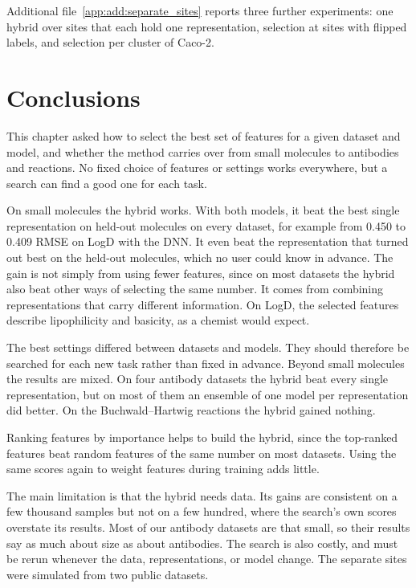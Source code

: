 Additional file~\ref{app:add:separate_sites} reports three further experiments: one hybrid over sites that each hold one representation, selection at sites with flipped labels, and selection per cluster of Caco-2.

\section{Conclusions}

This chapter asked how to select the best set of features for a given dataset and model, and whether the method carries over from small molecules to antibodies and reactions. No fixed choice of features or settings works everywhere, but a search can find a good one for each task.

On small molecules the hybrid works. With both models, it beat the best single representation on held-out molecules on every dataset, for example from 0.450 to 0.409 RMSE on LogD with the DNN. It even beat the representation that turned out best on the held-out molecules, which no user could know in advance. The gain is not simply from using fewer features, since on most datasets the hybrid also beat other ways of selecting the same number. It comes from combining representations that carry different information. On LogD, the selected features describe lipophilicity and basicity, as a chemist would expect.

The best settings differed between datasets and models. They should therefore be searched for each new task rather than fixed in advance. Beyond small molecules the results are mixed. On four antibody datasets the hybrid beat every single representation, but on most of them an ensemble of one model per representation did better. On the Buchwald--Hartwig reactions the hybrid gained nothing.

Ranking features by importance helps to build the hybrid, since the top-ranked features beat random features of the same number on most datasets. Using the same scores again to weight features during training adds little.

\label{sec:method:limitations}
The main limitation is that the hybrid needs data. Its gains are consistent on a few thousand samples but not on a few hundred, where the search's own scores overstate its results. Most of our antibody datasets are that small, so their results say as much about size as about antibodies. The search is also costly, and must be rerun whenever the data, representations, or model change. The separate sites were simulated from two public datasets.

